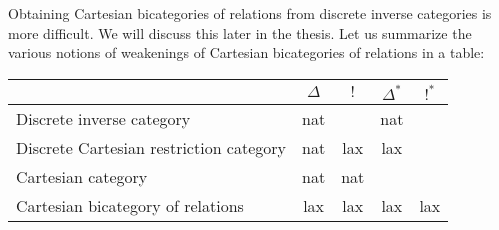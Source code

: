 Obtaining Cartesian bicategories of relations from discrete inverse categories is more difficult.  We will discuss this later in the thesis.
Let us summarize the various notions of weakenings of Cartesian bicategories of relations in a table:


\hfil
\begin{tabular}{l|cccc}
                                                     & $\Delta$          & $!$             & $\Delta^*$         & $!^*$\\
\hline
Discrete inverse category            & nat &  & nat  & \\
Discrete Cartesian restriction category      & nat &  lax  & lax \\
Cartesian category                                      & nat & nat &   \\
Cartesian bicategory of relations & lax  & lax & lax & lax \\
\end{tabular}
